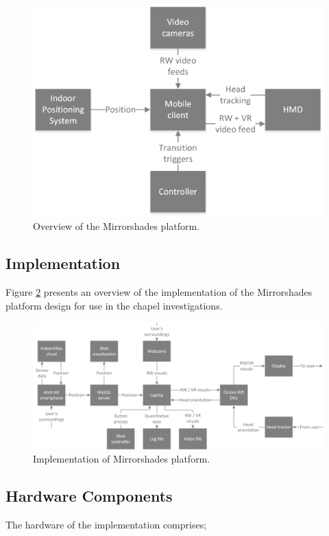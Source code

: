 \begin{figure}[h]
	\thispagestyle{empty}
	\begin{center}
		\includegraphics[width=.5\linewidth]{images/system-architecture.png}
		\caption{Overview of the Mirrorshades platform.}
		\label{systemarchitecture}
	\end{center}
\end{figure}


\subsection{Implementation}
Figure \ref{experimentalimplementation} presents an overview of the implementation of the Mirrorshades platform design for use in the chapel investigations.

\begin{figure}[h]
	\thispagestyle{empty}
	\begin{center}
		\includegraphics[width=.925\linewidth]{images/experimental-implementation.png}
		\caption{Implementation of Mirrorshades platform.}
		\label{experimentalimplementation}
	\end{center}
\end{figure}

\subsection{Hardware Components}
The hardware of the implementation comprises;

